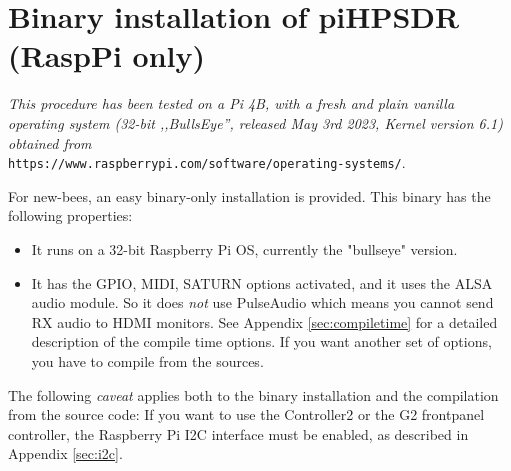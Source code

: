 \documentclass[12pt]{book}
\begin{document}
\chapter[RaspPi: binary piHPDSR installation]{Binary installation of piHPSDR (RaspPi only)}
\label{sec:installbinary}

\textit{This procedure has been tested on a Pi 4B, with a fresh and plain vanilla operating
system (32-bit ,,BullsEye'', released May 3rd 2023, Kernel version 6.1) obtained from} \\
\texttt{https://www.raspberrypi.com/software/operating-systems/}.



For new-bees, an easy binary-only installation is provided. This binary has the following
properties:

\begin{itemize}
\item{It runs on a 32-bit Raspberry Pi OS, currently the "bullseye" version.}
\item{It has the GPIO, MIDI, SATURN options activated, and it uses the ALSA audio
module.  So it does \textit{not} use PulseAudio
which means you cannot send RX audio to HDMI monitors. See
Appendix \ref{sec:compiletime} for a detailed description of the compile time options. If you want
another set of options, you have to compile from the sources.}
\end{itemize}

The following \textit{caveat} applies both to the binary installation and the compilation from
the source code: If you want to use the Controller2 or the G2 frontpanel controller,
 the Raspberry Pi I2C interface
must be enabled, as described in Appendix \ref{sec:i2c}.

\begin{center}
\end{center}
\end{document}
